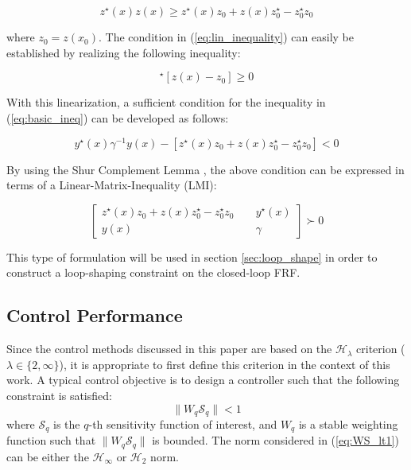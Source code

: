 \documentclass[a4paper, 10pt, conference]{ieeeconf}
\begin{document}
\begin{equation} \label{eq:lin_inequality}
z^{\star}(x)z(x) \geq z^{\star}(x)z_0 + z(x)z_0^{\star} - z_0^{\star}z_0
\end{equation} 

where $z_0 = z(x_0)$. The condition in (\ref{eq:lin_inequality}) can easily be established by realizing the following inequality:

\begin{equation}
[z(x)-z_0]^{\star}[z(x)-z_0] \geq 0
\end{equation}

With this linearization, a sufficient condition for the inequality in (\ref{eq:basic_ineq}) can be developed as follows:

\begin{equation}
y^{\star}(x) \gamma^{-1} y(x) - [z^{\star}(x)z_0 + z(x)z_0^{\star} - z_0^{\star}z_0]< 0 
\end{equation}

By using the Shur Complement Lemma \cite{BEN09}, the above condition can be expressed in terms of a Linear-Matrix-Inequality (LMI):

\begin{equation} \label{eq:LMI_1}
\begin{bmatrix}
z^{\star}(x)z_0 + z(x)z_0^{\star} - z_0^{\star}z_0 & \phantom{xx} y^{\star}(x) \\
y(x) & \phantom{xx} \gamma
\end{bmatrix}
\succ 0
\end{equation}

This type of formulation will be used in section \ref{sec:loop_shape} in order to construct a loop-shaping constraint on the closed-loop FRF.

\subsection{Control Performance}
Since the control methods discussed in this paper are based on the $\mathcal{H}_\lambda$ criterion ($\lambda \in \{2,\infty \}$), it is appropriate to first define this criterion in the context of this work. A typical control objective is to design a controller such that the following constraint is satisfied:
\begin{equation} \label{eq:WS_lt1}
\| W_q \mathcal{S}_q\| < 1
\end{equation}
where $\mathcal{S}_q$ is the $q$-th sensitivity function of interest, and $W_q$ is a stable weighting function such that $\| W_q \mathcal{S}_q\|$ is bounded. The norm considered in (\ref{eq:WS_lt1}) can be either the $\mathcal{H}_\infty$ or $\mathcal{H}_2$ norm. 
\end{document}
